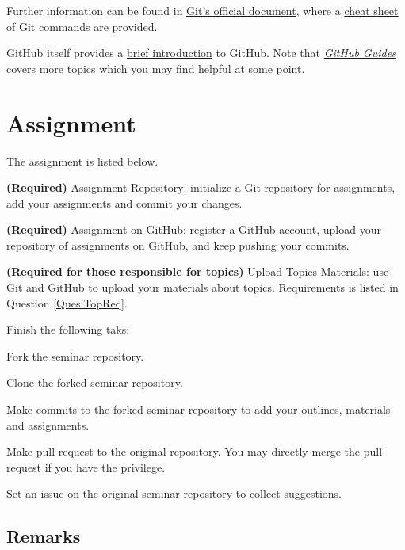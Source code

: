 \documentclass[english]{../TeXTemplate/pkupaper}
\begin{document}
Further information can be found in \href{https://git-scm.com/doc}{Git's official document}, where a \href{https://services.github.com/on-demand/downloads/github-git-cheat-sheet.pdf}{cheat sheet} of Git commands are provided.

GitHub itself provides a \href{https://guides.github.com/activities/hello-world/}{brief introduction} to GitHub. Note that \href{https://guides.github.com/}{\emph{GitHub Guides}} covers more topics which you may find helpful at some point.

\section{Assignment}

The assignment is listed below.

\begin{partlist}
\item \textbf{(Required)} Assignment Repository: initialize a Git repository for assignments, add your assignments and commit your changes.
\item \textbf{(Required)} Assignment on GitHub: register a GitHub account, upload your repository of assignments on GitHub, and keep pushing your commits.
\item \textbf{(Required for those responsible for topics)} Upload Topics Materials: use Git and GitHub to upload your materials about topics. Requirements is listed in Question \ref{Ques:TopReq}.
\end{partlist}

\begin{thmquestion} \label{Ques:TopReq}
Finish the following taks:
\begin{partlist}
\item Fork the seminar repository.
\item Clone the forked seminar repository.
\item Make commits to the forked seminar repository to add your outlines, materials and assignments.
\item Make pull request to the original repository. You may directly merge the pull request if you have the privilege.
\item Set an issue on the original seminar repository to collect suggestions.
\end{partlist}
\end{thmquestion}

\subsection{Remarks}
\end{document}
